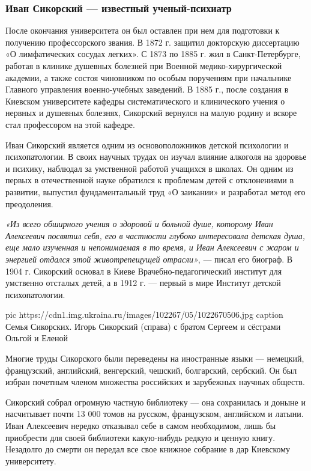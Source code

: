 \subsubsection{Иван Сикорский — известный ученый-психиатр}

После окончания университета он был оставлен при нем для подготовки к получению
профессорского звания. В 1872 г. защитил докторскую диссертацию «О
лимфатических сосудах легких». С 1873 по 1885 г. жил в Санкт-Петербурге,
работая в клинике душевных болезней при Военной медико-хирургической академии,
а также состоя чиновником по особым поручениям при начальнике Главного
управления военно-учебных заведений. В 1885 г., после создания в Киевском
университете кафедры систематического и клинического учения о нервных и
душевных болезнях, Сикорский вернулся на малую родину и вскоре стал профессором
на этой кафедре.

Иван Сикорский является одним из основоположников детской психологии и
психопатологии. В своих научных трудах он изучал влияние алкоголя на здоровье и
психику, наблюдал за умственной работой учащихся в школах. Он одним из первых в
отечественной науке обратился к проблемам детей с отклонениями в развитии,
выпустил фундаментальный труд «О заикании» и разработал метод его преодоления.

\emph{«Из всего обширного учения о здоровой и больной душе, которому Иван Алексеевич
посвятил себя, его в частности глубоко интересовала детская душа, еще мало
изученная и непонимаемая в то время, и Иван Алексеевич с жаром и энергией
отдался этой животрепещущей отрасли»}, — писал его биограф. В 1904 г. Сикорский
основал в Киеве Врачебно-педагогический институт для умственно отсталых детей,
а в 1912 г. — первый в мире Институт детской психопатологии.

\ifcmt
pic https://cdn1.img.ukraina.ru/images/102267/05/1022670506.jpg
caption Семья Сикорских. Игорь Сикорский (справа) с братом Сергеем и сёстрами Ольгой и Еленой
\fi

Многие труды Сикорского были переведены на иностранные языки — немецкий,
французский, английский, венгерский, чешский, болгарский, сербский. Он был
избран почетным членом множества российских и зарубежных научных обществ.

Сикорский собрал огромную частную библиотеку — она сохранилась и доныне и
насчитывает почти 13 000 томов на русском, французском, английском и латыни.
Иван Алексеевич нередко отказывал себе в самом необходимом, лишь бы приобрести
для своей библиотеки какую-нибудь редкую и ценную книгу. Незадолго до смерти он
передал все свое книжное собрание в дар Киевскому университету.

